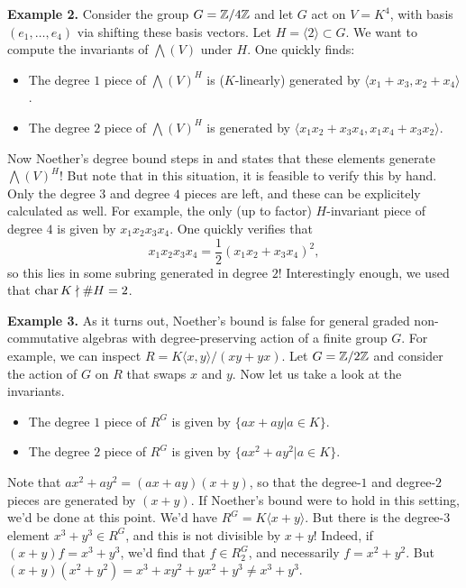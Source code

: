 \documentclass[../main.tex]{subfiles}
\begin{document}
\textbf{Example 2.} Consider the group $G = \mathbb{Z}/4\mathbb{Z}$ and let $G$ act on 
$V = K^4$, with basis $(e_1, \dots, e_4)$ via shifting these basis vectors.
Let $H = \langle 2 \rangle \subset G$. We want to compute the invariants of
$\bigwedge(V)$ under $H$. One quickly finds:
\begin{itemize}
    \item The degree $1$ piece of $\bigwedge(V)^H$ is ($K$-linearly) generated by $\langle x_1 +
        x_3, x_2 + x_4 \rangle$.
    \item The degree $2$ piece of $\bigwedge(V)^H$ is
        generated by $\langle x_1 x_2 + x_3x_4 , x_1 x_4 + x_3x_2\rangle.$
\end{itemize}
Now Noether's degree bound steps in and states that these elements generate
$\bigwedge(V)^H$! But note that in this situation, it is feasible to verify this 
by hand. Only the degree $3$ and degree $4$ pieces are left, and these can be 
explicitely calculated as well. For example, the only (up to factor) 
$H$-invariant piece of degree $4$ is given by $x_1 x_2 x_3 x_4$. One quickly
verifies that 
\begin{equation*}
    x_1 x_2 x_3 x_4 = \frac 12 (x_1 x_2 + x_3 x_4)^2,
\end{equation*}
so this lies in some subring generated in degree $2$! Interestingly enough, we 
used that $\operatorname{char} K \nmid \# H = 2$.

\textbf{Example 3.} 
As it turns out, Noether's bound is false for general graded non-commutative algebras
with degree-preserving action of a finite group $G$.
For example, we can inspect $R = K\langle x,y \rangle/(xy+yx)$.
Let $G = \mathbb{Z}/2\mathbb{Z}$ and consider the action of $G$ on $R$ that swaps $x$ and $y$.
Now let us take a look at the invariants. 
\begin{itemize}
    \item The degree $1$ piece of $R^G$ is given by $\{ax + ay | a \in K\}$.
    \item The degree $2$ piece of $R^G$ is given by $\{ax^2 + ay^2 | a \in K\}$.
\end{itemize}
Note that $ax^2 + ay^2 = (ax+ay)(x+y)$, so that the degree-$1$ and degree-$2$ pieces
are generated by $(x+y)$. If Noether's bound were to hold in this setting, we'd
be done at this point. We'd have $R^G = K\langle x+y \rangle$. But there is the
degree-$3$ element $x^3+y^3 \in R^G$, and this is not divisible by $x+y$!
Indeed, if $(x+y)f = x^3 +y^3$, we'd find that $f \in R^G_2$, and necessarily
$f = x^2 + y^2$. But $(x+y)(x^2 + y^2) = x^3 + xy^2 + yx^2 + y^3 \neq x^3 + y^3.$
\end{document}
